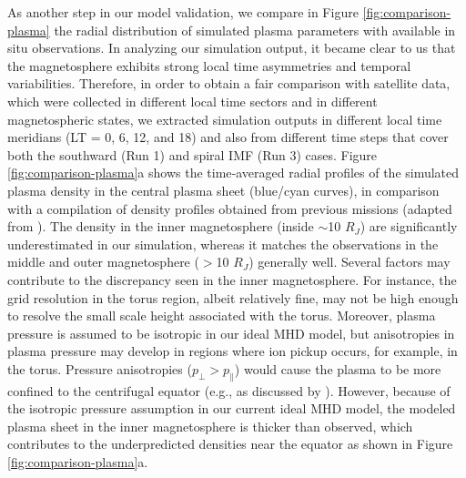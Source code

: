 As another step in our model validation, we compare in Figure \ref{fig:comparison-plasma} the radial distribution of simulated plasma parameters with available in situ observations. In analyzing our simulation output, it became clear to us that the magnetosphere exhibits strong local time asymmetries and temporal variabilities. Therefore, in order to obtain a fair comparison with satellite data, which were collected in different local time sectors and in different magnetospheric states, we extracted simulation outputs in different local time meridians (LT = 0, 6, 12, and 18) and also from different time steps that cover both the southward (Run 1) and spiral IMF (Run 3) cases. Figure \ref{fig:comparison-plasma}a shows the time‐averaged radial profiles of the simulated plasma density in the central plasma sheet (blue/cyan curves), in comparison with a compilation of density profiles obtained from previous missions (adapted from ). The density in the inner magnetosphere (inside $\sim$10 $R_J$) are significantly underestimated in our simulation, whereas it matches the observations in the middle and outer magnetosphere ($>$10 $R_J$) generally well. Several factors may contribute to the discrepancy seen in the inner magnetosphere. For instance, the grid resolution in the torus region, albeit relatively fine, may not be high enough to resolve the small scale height associated with the torus. Moreover, plasma pressure is assumed to be isotropic in our ideal MHD model, but anisotropies in plasma pressure may develop in regions where ion pickup occurs, for example, in the torus. Pressure anisotropies ($p_\perp > p_\parallel$) would cause the plasma to be more confined to the centrifugal equator (e.g., as discussed by ). However, because of the isotropic pressure assumption in our current ideal MHD model, the modeled plasma sheet in the inner magnetosphere is thicker than observed, which contributes to the underpredicted densities near the equator as shown in Figure \ref{fig:comparison-plasma}a. 

